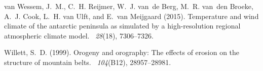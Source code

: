 \documentclass[11pt]{article}
\begin{document}
\begin{thebibliography}{}
van Wessem, J.~M., C.~H. Reijmer, W.~J. van~de Berg, M.~R. van~den Broeke,
  A.~J. Cook, L.~H. van Ulft, and E.~van Meijgaard (2015).
\newblock Temperature and wind climate of the antarctic peninsula as simulated
  by a high-resolution regional atmospheric climate model.
~{\em 28\/}(18), 7306--7326.

Willett, S.~D. (1999).
\newblock Orogeny and orography: The effects of erosion on the structure of
  mountain belts.
~{\em 104\/}(B12), 28957--28981.

\end{thebibliography}
\end{document}
